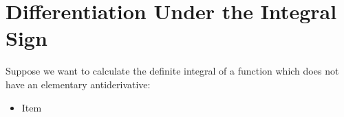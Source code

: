 
\section{Differentiation Under the Integral Sign}
Suppose we want to calculate the definite integral of a function which does not have an elementary antiderivative:

\begin{itemize}
    \item Item
\end{itemize}


